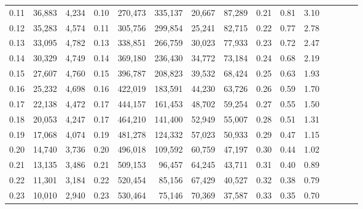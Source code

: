\begin{tabular}{rrrcrrrrrrrrrrr}
0.11 &  36,883 &  4,234 &                                       0.10 &  270,473 &  335,137 &   20,667 &   87,289 &  0.21 &  0.81 &                         3.10 \\
0.12 &  35,283 &  4,574 &                                       0.11 &  305,756 &  299,854 &   25,241 &   82,715 &  0.22 &  0.77 &                         2.78 \\
0.13 &  33,095 &  4,782 &                                       0.13 &  338,851 &  266,759 &   30,023 &   77,933 &  0.23 &  0.72 &                         2.47 \\
0.14 &  30,329 &  4,749 &                                       0.14 &  369,180 &  236,430 &   34,772 &   73,184 &  0.24 &  0.68 &                         2.19 \\
0.15 &  27,607 &  4,760 &                                       0.15 &  396,787 &  208,823 &   39,532 &   68,424 &  0.25 &  0.63 &                         1.93 \\
0.16 &  25,232 &  4,698 &                                       0.16 &  422,019 &  183,591 &   44,230 &   63,726 &  0.26 &  0.59 &                         1.70 \\
0.17 &  22,138 &  4,472 &                                       0.17 &  444,157 &  161,453 &   48,702 &   59,254 &  0.27 &  0.55 &                         1.50 \\
0.18 &  20,053 &  4,247 &                                       0.17 &  464,210 &  141,400 &   52,949 &   55,007 &  0.28 &  0.51 &                         1.31 \\
0.19 &  17,068 &  4,074 &                                       0.19 &  481,278 &  124,332 &   57,023 &   50,933 &  0.29 &  0.47 &                         1.15 \\
0.20 &  14,740 &  3,736 &                                       0.20 &  496,018 &  109,592 &   60,759 &   47,197 &  0.30 &  0.44 &                         1.02 \\
0.21 &  13,135 &  3,486 &                                       0.21 &  509,153 &   96,457 &   64,245 &   43,711 &  0.31 &  0.40 &                         0.89 \\
0.22 &  11,301 &  3,184 &                                       0.22 &  520,454 &   85,156 &   67,429 &   40,527 &  0.32 &  0.38 &                         0.79 \\
0.23 &  10,010 &  2,940 &                                       0.23 &  530,464 &   75,146 &   70,369 &   37,587 &  0.33 &  0.35 &                         0.70 \\

\end{tabular}
